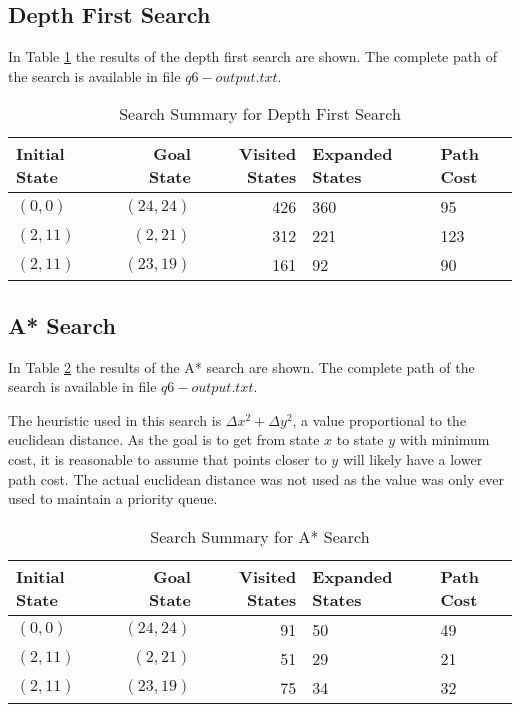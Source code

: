\documentclass{article}
\begin{document}
\subsection{Depth First Search}
    In Table \ref{tab:dfs6} the results of the depth first search are shown. The complete path of the search is available in file $q6-output.txt$.
    \begin{table}[!htp]\centering
        \caption{Search Summary for Depth First Search}\label{tab:dfs6}
        \scriptsize
        \begin{tabular}{lrrll}\toprule
        Initial State &Goal State &Visited States&Expanded States&Path Cost  \\\midrule
        $(0,0)$ & $(24,24)$ & 426 & 360 & 95 \\
        $(2, 11)$ & $(2, 21)$ & 312 & 221 & 123 \\
        $(2, 11)$ & $(23, 19)$ & 161 & 92 & 90 \\
    \end{tabular}
    \end{table}

\subsection{A* Search}
    In Table \ref{tab:a*6} the results of the A* search are shown. The complete path of the search is available in file $q6-output.txt$.
    \setlength{\parskip}{6pt}

    The heuristic used in this search is $\Delta x^2 + \Delta y^2$, a value proportional to the euclidean distance. As the goal is to get from state $x$ to state $y$ with minimum cost, it is reasonable to assume that points closer to $y$ will likely have a lower path cost. The actual euclidean distance was not used as the value was only ever used to maintain a priority queue.
    \begin{table}[!htp]\centering
        \caption{Search Summary for A* Search}\label{tab:a*6}
        \scriptsize
        \begin{tabular}{lrrll}\toprule
        Initial State &Goal State &Visited States&Expanded States&Path Cost  \\\midrule
        $(0,0)$ & $(24,24)$ & 91 & 50 & 49 \\
        $(2, 11)$ & $(2, 21)$ & 51 & 29 & 21 \\
        $(2, 11)$ & $(23, 19)$ & 75 & 34 & 32 \\
    \end{tabular}
    \end{table}
\end{document}
